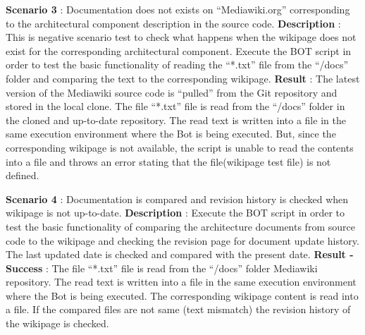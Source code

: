 \begin{mdframed}[leftmargin=10pt,rightmargin=10pt]
\textbf{Scenario 3} : Documentation does not exists on \enquote{Mediawiki.org} corresponding to the architectural component description in the source code.
\newline
\newline \textbf{Description} : This is negative scenario test to check what happens when the wikipage does not exist for the corresponding architectural component. Execute the BOT script in order to test the basic functionality of reading the \enquote{*.txt} file from the \enquote{/docs} folder and comparing the text to the corresponding wikipage. 
\newline 
\newline \textbf{Result} : The latest version of the Mediawiki source code is \enquote{pulled} from the Git repository and stored in the local clone. The file \enquote{*.txt} file is read from the \enquote{/docs} folder in the cloned and up-to-date repository. The read text is written into a file in the same execution environment where the Bot is being executed. But, since the corresponding wikipage is not available, the script is unable to read the contents into a file and throws an error stating that the file(wikipage test file) is not defined.
\end{mdframed}
\begin{mdframed}[leftmargin=10pt,rightmargin=10pt]
\textbf{Scenario 4} : Documentation is compared and revision history is checked when wikipage is not up-to-date.
\newline
\newline \textbf{Description} : Execute the BOT script in order to test the basic functionality of comparing the architecture documents from source code to the wikipage and checking the revision page for document update history. The last updated date is checked and compared with the present date.
\newline 
\newline \textbf{Result - Success} : The file \enquote{*.txt} file is read from the \enquote{/docs} folder Mediawiki repository. The read text is written into a file in the same execution environment where the Bot is being executed. The corresponding wikipage content is read into a file. If the compared files are not same (text mismatch) the revision history of the wikipage is checked.
\end{mdframed}
